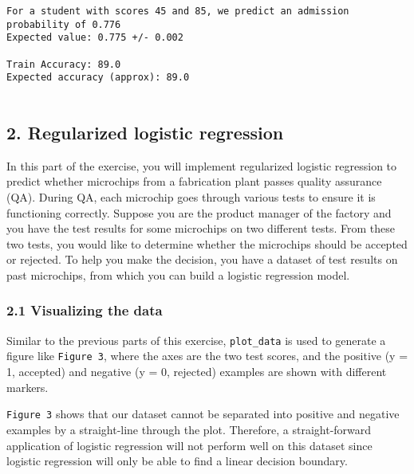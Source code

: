 \documentclass[11pt]{article}
\begin{document}
    \begin{Verbatim}[commandchars=\\\{\}]
For a student with scores 45 and 85, we predict an admission probability of 0.776
Expected value: 0.775 +/- 0.002

Train Accuracy: 89.0
Expected accuracy (approx): 89.0


    \end{Verbatim}

    \subsection{2. Regularized logistic
regression}\label{regularized-logistic-regression}

In this part of the exercise, you will implement regularized logistic
regression to predict whether microchips from a fabrication plant passes
quality assurance (QA). During QA, each microchip goes through various
tests to ensure it is functioning correctly. Suppose you are the product
manager of the factory and you have the test results for some microchips
on two different tests. From these two tests, you would like to
determine whether the microchips should be accepted or rejected. To help
you make the decision, you have a dataset of test results on past
microchips, from which you can build a logistic regression model.

\subsubsection{2.1 Visualizing the data}\label{visualizing-the-data}

Similar to the previous parts of this exercise, \texttt{plot\_data} is
used to generate a figure like \texttt{Figure\ 3}, where the axes are
the two test scores, and the positive (y = 1, accepted) and negative (y
= 0, rejected) examples are shown with different markers.

\texttt{Figure\ 3} shows that our dataset cannot be separated into
positive and negative examples by a straight-line through the plot.
Therefore, a straight-forward application of logistic regression will
not perform well on this dataset since logistic regression will only be
able to find a linear decision boundary.
\end{document}
